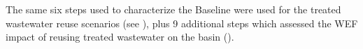 
The same six steps used to characterize the Baseline were used for the treated wastewater reuse scenarios (see ), plus 9 additional steps which assessed the WEF impact of reusing treated wastewater on the basin ().

